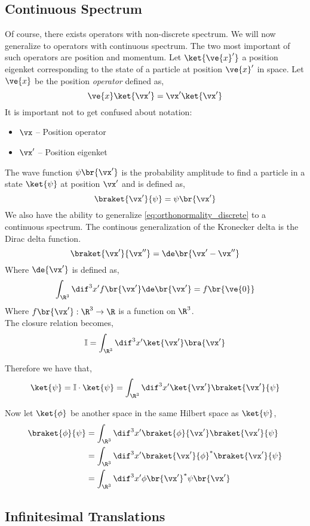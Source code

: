 \documentclass{article}
\begin{document}
\subsection{Continuous Spectrum}
Of course, there exists operators with non-discrete spectrum. We will now generalize to operators with continuous spectrum. The two most important of such operators are position and momentum. Let $\ket{\ve{x}'}$ a position eigenket corresponding to the state of a particle at position $\ve{x}'$ in space. Let $\ve{x}$ be the position \textit{operator} defined as,
\[ \ve{x} \ket{\vx'} = \vx' \ket{\vx'} \]
It is important not to get confused about notation:
\begin{itemize}
    \item $\vx$ -- Position operator
    \item $\vx'$ -- Position eigenket
\end{itemize}
The wave function $\psi\br{\vx'}$ is the probability amplitude to find a particle in a state $\ket{\psi}$ at position $\vx'$ and is defined as,
\[ \braket{\vx'}{\psi} = \psi\br{\vx'} \]
We also have the ability to generalize \cref{eq:orthonormality_discrete} to a continuous spectrum. The continous generalization of the Kronecker delta is the Dirac delta function.
\[ \braket{\vx'}{\vx''} = \de\br{\vx' - \vx''} \]
Where $\de{\vx'}$ is defined as,
\[ \int_{\R^3} \dif^3 x' f\br{\vx'} \de\br{\vx'} = f\br{\ve{0}} \]
Where $f\br{\vx'} : \R^3 \to \R$ is a function on $\R^3$. \\

The closure relation becomes,
\[ \mathbb{I} = \int_{\R^3} \dif^3 x' \ket{\vx'} \bra{\vx'} \]

Therefore we have that,
\[ \ket{\psi} = \mathbb{I} \cdot \ket{\psi} = \int_{\R^3} \dif^3 x' \ket{\vx'} \braket{\vx'}{\psi} \]

Now let $\ket{\phi}$ be another space in the same Hilbert space as $\ket{\psi}$,
\begin{align*}
\braket{\phi}{\psi} &= \int_{\R^3} \dif^3 x' \braket{\phi}{\vx'} \braket{\vx'}{\psi} \\
&= \int_{\R^3} \dif^3 x' \braket{\vx'}{\phi}^{*} \braket{\vx'}{\psi} \\
&= \int_{\R^3} \dif^3 x' \phi\br{\vx'}^{*} \psi\br{\vx'}
\end{align*}

\subsection{Infinitesimal Translations}
\end{document}

